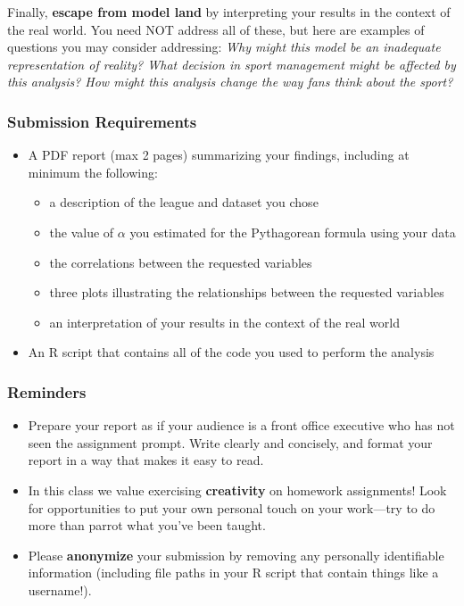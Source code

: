 \documentclass{article}
\begin{document}
      Finally, {\bf escape from model land} by interpreting your results in the context of the real world. You need NOT address all of these, but here are examples of questions you may consider addressing: {\it Why might this model be an inadequate representation of reality? What decision in sport management might be affected by this analysis? How might this analysis change the way fans think about the sport?}

      \subsubsection*{\sc Submission Requirements}

        \begin{itemize}
          \item A PDF report (max 2 pages) summarizing your findings, including at minimum the following:
          \begin{itemize}
            \item a description of the league and dataset you chose
            \item the value of $\alpha$ you estimated for the Pythagorean formula using your data
            \item the correlations between the requested variables
            \item three plots illustrating the relationships between the requested variables
            \item an interpretation of your results in the context of the real world
          \end{itemize}
          \item An R script that contains all of the code you used to perform the analysis
        \end{itemize}

      \subsubsection*{\sc Reminders}

        \begin{itemize}
          \item Prepare your report as if your audience is a front office executive who has not seen the assignment prompt. Write clearly and concisely, and format your report in a way that makes it easy to read.
          \item In this class we value exercising {\bf creativity} on homework assignments! Look for opportunities to put your own personal touch on your work---try to do more than parrot what you've been taught.
          \item Please {\bf anonymize} your submission by removing any personally identifiable information (including file paths in your R script that contain things like a username!).
        \end{itemize}
\end{document}

